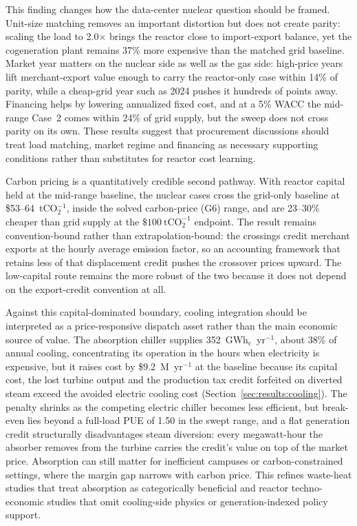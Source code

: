 \documentclass[sn-vancouver,Numbered]{sn-jnl}%
\begin{document}
This finding changes how the data-center nuclear question should be framed. Unit-size matching removes an important distortion but does not create parity: scaling the load to 2.0$\times$ brings the reactor close to import-export balance, yet the cogeneration plant remains 37\% more expensive than the matched grid baseline. Market year matters on the nuclear side as well as the gas side: high-price years lift merchant-export value enough to carry the reactor-only case within 14\% of parity, while a cheap-grid year such as 2024 pushes it hundreds of points away. Financing helps by lowering annualized fixed cost, and at a 5\% WACC the mid-range Case~2 comes within 24\% of grid supply, but the sweep does not cross parity on its own. These results suggest that procurement discussions should treat load matching, market regime and financing as necessary supporting conditions rather than substitutes for reactor cost learning.

Carbon pricing is a quantitatively credible second pathway. With reactor capital held at the mid-range baseline, the nuclear cases cross the grid-only baseline at \$53--64~tCO$_2^{-1}$, inside the solved carbon-price (G6) range, and are 23--30\% cheaper than grid supply at the \(\$100~\mathrm{tCO}_2^{-1}\) endpoint. The result remains convention-bound rather than extrapolation-bound: the crossings credit merchant exports at the hourly average emission factor, so an accounting framework that retains less of that displacement credit pushes the crossover prices upward. The low-capital route remains the more robust of the two because it does not depend on the export-credit convention at all.

Against this capital-dominated boundary, cooling integration should be interpreted as a price-responsive dispatch asset rather than the main economic source of value. The absorption chiller supplies 352~GWh$_\mathrm{c}$~yr$^{-1}$, about 38\% of annual cooling, concentrating its operation in the hours when electricity is expensive, but it raises cost by \$9.2~M~yr$^{-1}$ at the baseline because its capital cost, the lost turbine output and the production tax credit forfeited on diverted steam exceed the avoided electric cooling cost (Section~\ref{sec:results:cooling}). The penalty shrinks as the competing electric chiller becomes less efficient, but break-even lies beyond a full-load PUE of 1.50 in the swept range, and a flat generation credit structurally disadvantages steam diversion: every megawatt-hour the absorber removes from the turbine carries the credit's value on top of the market price. Absorption can still matter for inefficient campuses or carbon-constrained settings, where the margin gap narrows with carbon price. This refines waste-heat studies that treat absorption as categorically beneficial and reactor techno-economic studies that omit cooling-side physics or generation-indexed policy support.
\end{document}
